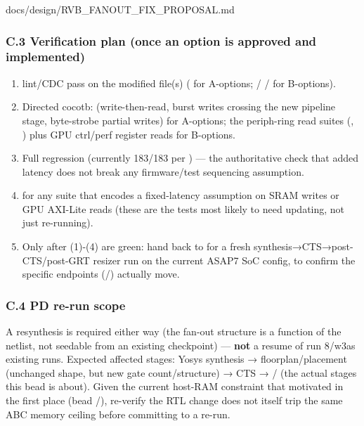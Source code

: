 \begin{relocated}{docs/design/RVB_FANOUT_FIX_PROPOSAL.md}
\subsubsection{C.3 Verification plan (once an option is approved and
implemented)}\label{tm:pd:rvb-fanout-fix:c3-verification-plan-once-an-option-is-approved-and-implemented}

\begin{enumerate}
\def\labelenumi{\arabic{enumi}.}
\tightlist
\item
   lint/CDC pass on the
  modified file(s) ( for A-options;
   /  /
   for B-options).
\item
  Directed cocotb: 
  (write-then-read, burst writes crossing the new pipeline stage,
  byte-strobe partial writes) for A-options; the periph-ring read suites
  (, ) plus
  GPU ctrl/perf register reads for B-options.
\item
  Full  regression (currently 183/183 per )
  --- the authoritative check that added latency does not break any
  firmware/\allowbreak{}test sequencing assumption.
\item
   for any
  suite that encodes a fixed-latency assumption on SRAM writes or GPU
  AXI-Lite reads (these are the tests most likely to need updating, not
  just re-running).
\item
  Only after (1)-(4) are green: hand back to
   for a fresh
  synthesis→CTS→post-CTS/\allowbreak{}post-GRT resizer run on the
  current  ASAP7 SoC config, to confirm the
  specific endpoints (/)
  actually move.
\end{enumerate}

\subsubsection{C.4 PD re-run scope}\label{tm:pd:rvb-fanout-fix:c4-pd-re-run-scope}

A resynthesis is required either way (the fan-out structure is a
function of the netlist, not seedable from an existing checkpoint) ---
\textbf{not} a  resume of run 8/w3a\textquotesingle s
existing runs. Expected affected stages: Yosys synthesis →
floorplan/\allowbreak{}placement (unchanged shape, but new gate
count/\allowbreak{}structure) → CTS →
/ (the actual
stages this bead is about). Given the current host-RAM constraint that
motivated  in the first
place (bead /), re-verify the RTL change does not
itself trip the same ABC memory ceiling before committing to a
 re-run.


\end{relocated}
